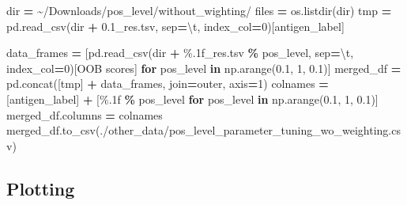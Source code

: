 \documentclass[
  11pt,
  oneside]{book}
\newenvironment{Shaded}{\begin{snugshade}}{\end{snugshade}}
\newcommand{\BuiltInTok}[1]{#1}
\newcommand{\CharTok}[1]{\textcolor[rgb]{0.31,0.60,0.02}{#1}}
\newcommand{\ControlFlowTok}[1]{\textcolor[rgb]{0.13,0.29,0.53}{\textbf{#1}}}
\newcommand{\DecValTok}[1]{\textcolor[rgb]{0.00,0.00,0.81}{#1}}
\newcommand{\FloatTok}[1]{\textcolor[rgb]{0.00,0.00,0.81}{#1}}
\newcommand{\KeywordTok}[1]{\textcolor[rgb]{0.13,0.29,0.53}{\textbf{#1}}}
\newcommand{\NormalTok}[1]{#1}
\newcommand{\OperatorTok}[1]{\textcolor[rgb]{0.81,0.36,0.00}{\textbf{#1}}}
\newcommand{\SpecialCharTok}[1]{\textcolor[rgb]{0.00,0.00,0.00}{#1}}
\newcommand{\StringTok}[1]{\textcolor[rgb]{0.31,0.60,0.02}{#1}}
\begin{document}
\begin{Shaded}
\begin{Highlighting}[]
\BuiltInTok{dir} \OperatorTok{=} \StringTok{\textquotesingle{}\textasciitilde{}/Downloads/pos\_level/without\_wighting/\textquotesingle{}}
\NormalTok{files }\OperatorTok{=}\NormalTok{ os.listdir(}\BuiltInTok{dir}\NormalTok{)}
\NormalTok{tmp }\OperatorTok{=}\NormalTok{ pd.read\_csv(}\BuiltInTok{dir} \OperatorTok{+} \StringTok{\textquotesingle{}0.1\_res.tsv\textquotesingle{}}\NormalTok{, sep}\OperatorTok{=}\StringTok{\textquotesingle{}}\CharTok{\textbackslash{}t}\StringTok{\textquotesingle{}}\NormalTok{, index\_col}\OperatorTok{=}\DecValTok{0}\NormalTok{)[}\StringTok{\textquotesingle{}antigen\_label\textquotesingle{}}\NormalTok{]}

\NormalTok{data\_frames }\OperatorTok{=}\NormalTok{ [pd.read\_csv(}\BuiltInTok{dir} \OperatorTok{+} \StringTok{\textquotesingle{}}\SpecialCharTok{\%.1f}\StringTok{\_res.tsv\textquotesingle{}} \OperatorTok{\%}\NormalTok{ pos\_level, sep}\OperatorTok{=}\StringTok{\textquotesingle{}}\CharTok{\textbackslash{}t}\StringTok{\textquotesingle{}}\NormalTok{, index\_col}\OperatorTok{=}\DecValTok{0}\NormalTok{)[}\StringTok{\textquotesingle{}OOB scores\textquotesingle{}}\NormalTok{] }\ControlFlowTok{for}\NormalTok{ pos\_level }\KeywordTok{in}\NormalTok{ np.arange(}\FloatTok{0.1}\NormalTok{, }\DecValTok{1}\NormalTok{, }\FloatTok{0.1}\NormalTok{)]}
\NormalTok{merged\_df }\OperatorTok{=}\NormalTok{ pd.concat([tmp] }\OperatorTok{+}\NormalTok{ data\_frames, join}\OperatorTok{=}\StringTok{\textquotesingle{}outer\textquotesingle{}}\NormalTok{, axis}\OperatorTok{=}\DecValTok{1}\NormalTok{)}
\NormalTok{colnames }\OperatorTok{=}\NormalTok{ [}\StringTok{\textquotesingle{}antigen\_label\textquotesingle{}}\NormalTok{] }\OperatorTok{+}\NormalTok{ [}\StringTok{\textquotesingle{}}\SpecialCharTok{\%.1f}\StringTok{\textquotesingle{}} \OperatorTok{\%}\NormalTok{ pos\_level }\ControlFlowTok{for}\NormalTok{ pos\_level }\KeywordTok{in}\NormalTok{ np.arange(}\FloatTok{0.1}\NormalTok{, }\DecValTok{1}\NormalTok{, }\FloatTok{0.1}\NormalTok{)]}
\NormalTok{merged\_df.columns }\OperatorTok{=}\NormalTok{ colnames}
\NormalTok{merged\_df.to\_csv(}\StringTok{\textquotesingle{}./other\_data/pos\_level\_parameter\_tuning\_wo\_weighting.csv\textquotesingle{}}\NormalTok{)}
\end{Highlighting}
\end{Shaded}

\hypertarget{plotting-1}{%
\subsection{Plotting}\label{plotting-1}}
\end{document}
